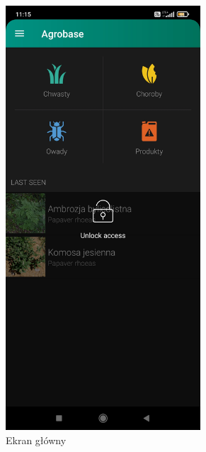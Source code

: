 \documentclass[a4paper,12pt,oneside]{book}
\begin{document}
	\begin{figure}[H]
		\centering
		\begin{subfigure}{.5\textwidth}
			\centering
			\includegraphics[width=0.8\textwidth]{grafika/db_0.jpg}
			\caption{Ekran główny}
		\end{subfigure}%
		\begin{subfigure}{.5\textwidth}
			\centering

\end{subfigure}
\end{figure}
\end{document}
